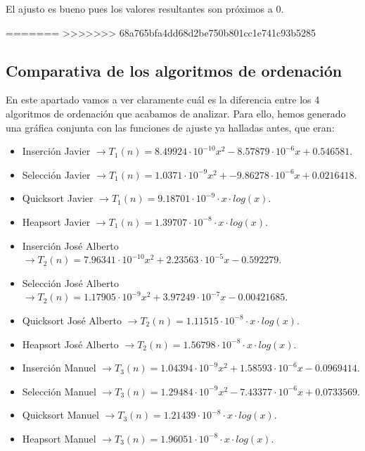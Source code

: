 \documentclass[10pt,a4paper]{article}
\begin{document}
El ajusto es bueno pues los valores resultantes son próximos a 0.

=======
>>>>>>> 68a765bfa4dd68d2be750b801cc1e741c93b5285
\subsection{Comparativa de los algoritmos de ordenación}

En este apartado vamos a ver claramente cuál es la diferencia entre los 4 algoritmos de ordenación que acabamos de analizar. Para ello, hemos generado una gráfica conjunta con las funciones de ajuste ya halladas antes, que eran:

\begin{itemize}
	\item Inserción Javier \(\rightarrow T_1(n) = 8.49924 \cdot 10^{-10} x^2 - 8.57879 \cdot 10^{-6} x + 0.546581\).
	\item Selección Javier \(\rightarrow T_1(n) = 1.0371 \cdot 10^{-9} x^2 + -9.86278 \cdot 10^{-6} x +0.0216418\).
	\item Quicksort Javier \(\rightarrow T_1(n) = 9.18701 \cdot 10^{-9} \cdot x \cdot log(x)\).
	\item Heapsort Javier \(\rightarrow T_1(n) = 1.39707 \cdot 10^{-8} \cdot x \cdot log(x)\).
\end{itemize}

\begin{itemize}
	\item Inserción José Alberto \(\rightarrow T_2(n) = 7.96341 \cdot 10^{-10} x^2 + 2.23563 \cdot 10^{-5} x - 0.592279\).
	\item Selección José Alberto \(\rightarrow T_2(n) = 1.17905 \cdot 10^{-9} x^2 + 3.97249 \cdot 10^{-7} x - 0.00421685\).
	\item Quicksort José Alberto \(\rightarrow T_2(n) = 1.11515 \cdot 10^{-8} \cdot x \cdot log(x)\).
	\item Heapsort José Alberto \(\rightarrow T_2(n) = 1.56798 \cdot 10^{-8} \cdot x \cdot log(x)\).
\end{itemize}

\begin{itemize}
	\item Inserción Manuel \(\rightarrow T_3(n) = 1.04394 \cdot 10^{-9} x^2 + 1.58593 \cdot 10^{-6} x - 0.0969414\).
	\item Selección Manuel \(\rightarrow T_3(n) = 1.29484 \cdot 10^{-9} x^2 - 7.43377 \cdot 10^{-6} x + 0.0733569\).
	\item Quicksort Manuel \(\rightarrow T_3(n) = 1.21439 \cdot 10^{-8} \cdot x \cdot log(x)\).
	\item Heapsort Manuel \(\rightarrow T_3(n) = 1.96051 \cdot 10^{-8} \cdot x \cdot log(x)\).
\end{itemize}
\end{document}
